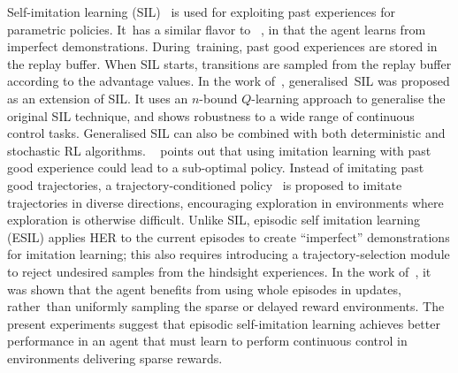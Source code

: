 Self-imitation learning (SIL)~\cite{oh2018self} is used for exploiting past experiences for parametric policies. It~has a similar flavor to ~\cite{gangwani2018learning, pmlr-v97-wu19a}, in that the agent learns from imperfect demonstrations. During~training, past good experiences are stored in the replay buffer. When SIL starts, transitions are sampled from the replay buffer according to the advantage values. {In the work of~\cite{tang2020self}, generalised~SIL was proposed as an extension of SIL. It uses an $n$-bound $Q$-learning approach to generalise the original SIL technique, and shows robustness to a wide range of continuous control tasks. Generalised SIL can also be combined with both deterministic and stochastic RL algorithms. ~\cite{guo2019self} points out that using imitation learning with past good experience could lead to a sub-optimal policy. Instead of imitating past good trajectories, a trajectory-conditioned policy~\cite{guo2019self} is proposed to imitate trajectories in diverse directions, encouraging exploration in environments where exploration is otherwise difficult.} Unlike SIL, episodic self imitation learning (ESIL) applies HER to the current episodes to create ``imperfect'' demonstrations for imitation learning; this also requires introducing a trajectory-selection module to reject undesired samples from the hindsight experiences. In the work of~\cite{lee2019sample}, it was shown that the agent benefits from using whole episodes in updates, rather~than uniformly sampling the sparse or delayed reward environments. {The present} experiments suggest that episodic self-imitation learning {achieves better performance in an agent that must learn to perform continuous control in environments delivering sparse rewards}.

